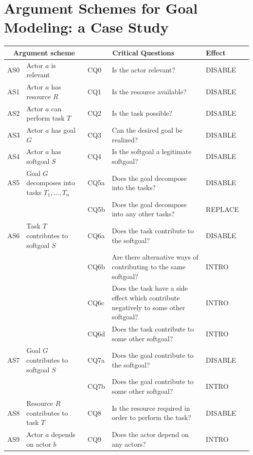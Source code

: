 \section{Argument Schemes for Goal Modeling: a Case Study}
\label{sect:gmas}

\begin{table}[h]
\centering
\begin{tabularx}{\textwidth}{|l|l|l|X|l|l|}
\hline
\multicolumn{2}{|c|}{\textbf{Argument scheme}} & \multicolumn{2}{c|}{\textbf{Critical Questions}} & \textbf{Effect}\\
\hline
AS0 & Actor $a$ is relevant & CQ0 &Is the actor relevant? & DISABLE\\
\hline
AS1 & Actor $a$ has resource $R$ & CQ1 &Is the resource available? & DISABLE\\
\hline
AS2 & Actor $a$ can perform task $T$ & CQ2 &Is the task possible? & DISABLE\\
\hline
AS3 & Actor $a$ has goal $G$ & CQ3 & Can the desired goal be realized? & DISABLE\\
\hline
AS4 & Actor $a$ has softgoal $S$ & CQ4 & Is the softgoal a legitimate softgoal?& DISABLE\\
\hline
\hline
AS5 & Goal $G$ decomposes into tasks $T_1,\ldots,T_n$ & CQ5a & Does the goal decompose into the tasks?& DISABLE\\
& & CQ5b & Does the goal decompose into any other tasks?& REPLACE\\
\hline
AS6 & Task $T$ contributes to softgoal $S$& CQ6a & Does the task contribute to the softgoal?& DISABLE\\
&& CQ6b & Are there alternative ways of contributing to the same softgoal?& INTRO \\
&& CQ6c & Does the task have a side effect which contribute negatively to some other softgoal?& INTRO\\
&& CQ6d & Does the task contribute to some other softgoal?& INTRO\\
\hline
AS7 & Goal $G$ contributes to softgoal $S$ & CQ7a & Does the goal contribute to the softgoal?& DISABLE\\
&& CQ7b & Does the goal contribute to some other softgoal?& INTRO\\
\hline
AS8 & Resource $R$ contributes to task $T$ & CQ8 & Is the resource required in order to perform the task?& DISABLE\\
\hline
AS9 & Actor $a$ depends on actor $b$ & CQ9 & Does the actor depend on any actors?& INTRO\\

\end{tabularx}
\end{table}
